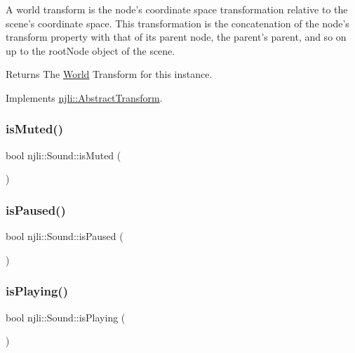 A world transform is the node’s coordinate space transformation relative to the scene’s coordinate space. This transformation is the concatenation of the node’s transform property with that of its parent node, the parent’s parent, and so on up to the root\+Node object of the scene.

\begin{DoxyReturn}{Returns}
The \mbox{\hyperlink{classnjli_1_1_world}{World}} Transform for this instance. 
\end{DoxyReturn}


Implements \mbox{\hyperlink{classnjli_1_1_abstract_transform_a25e1a5d3daf3c0c5839915f33e37e51a}{njli\+::\+Abstract\+Transform}}.

\mbox{\label{classnjli_1_1_sound_a75777bf34afc2d2c3a83238dbc67aae3}} 
\subsubsection{\texorpdfstring{is\+Muted()}{isMuted()}}
{\footnotesize\ttfamily bool njli\+::\+Sound\+::is\+Muted (\begin{DoxyParamCaption}{ }\end{DoxyParamCaption})}

\mbox{\label{classnjli_1_1_sound_a78cf20388060b6be413aadc5967193c4}} 
\subsubsection{\texorpdfstring{is\+Paused()}{isPaused()}}
{\footnotesize\ttfamily bool njli\+::\+Sound\+::is\+Paused (\begin{DoxyParamCaption}{ }\end{DoxyParamCaption})}

\mbox{\label{classnjli_1_1_sound_a24d6a4011b3148bf41801ad68350d14b}} 
\subsubsection{\texorpdfstring{is\+Playing()}{isPlaying()}}
{\footnotesize\ttfamily bool njli\+::\+Sound\+::is\+Playing (\begin{DoxyParamCaption}{ }\end{DoxyParamCaption})}

